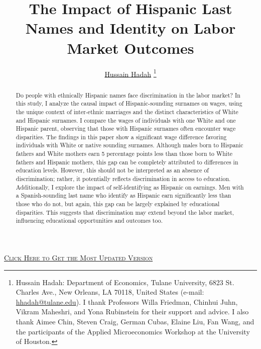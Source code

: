 \documentclass[12pt,english]{article}
\begin{document}
\title{The Impact of Hispanic Last Names and Identity on Labor Market Outcomes}

\author{\href{https://hussainhadah.com/}{Hussain Hadah} \thanks{Hussain Hadah: Department of Economics, Tulane University, 6823 St. Charles Ave., New Orleans, LA 70118, United States (e-mail: \href{mailto:hhadah@tulane.edu}{hhadah@tulane.edu}). I thank Professors Willa Friedman, Chinhui Juhn, Vikram Maheshri, and Yona Rubinstein for their support and advice. I also thank Aimee Chin, Steven Craig, German Cubas, Elaine Liu, Fan Wang, and the participants of the Applied Microeconomics Workshop at the University of Houston.}}


\maketitle

\begin{center}
\href{https://hhadah.github.io/hispanic-last-names/my_paper/Hadah-last-names-draft.pdf}{\textcolor{green!15!black!30!blue}{\footnotesize{\textsc{Click Here to Get the Most Updated Version}}}}
\end{center}

\begin{abstract}
\singlespacing Do people with ethnically Hispanic names face discrimination in the labor market? In this study, I analyze the causal impact of Hispanic-sounding surnames on wages, using the unique context of inter-ethnic marriages and the distinct characteristics of White and Hispanic surnames. I compare the wages of individuals with one White and one Hispanic parent, observing that those with Hispanic surnames often encounter wage disparities. The findings in this paper show a significant wage difference favoring individuals with White or native sounding surnames. Although males born to Hispanic fathers and White mothers earn 5 percentage points less than those born to White fathers and Hispanic mothers, this gap can be completely attributed to differences in education levels. However, this should not be interpreted as an absence of discrimination; rather, it potentially reflects discrimination in access to education. Additionally, I explore the impact of self-identifying as Hispanic on earnings. Men with a Spanish-sounding last name who identify as Hispanic earn significantly less than those who do not, but again, this gap can be largely explained by educational disparities. This suggests that discrimination may extend beyond the labor market, influencing educational opportunities and outcomes too.


\end{abstract}
\end{document}
